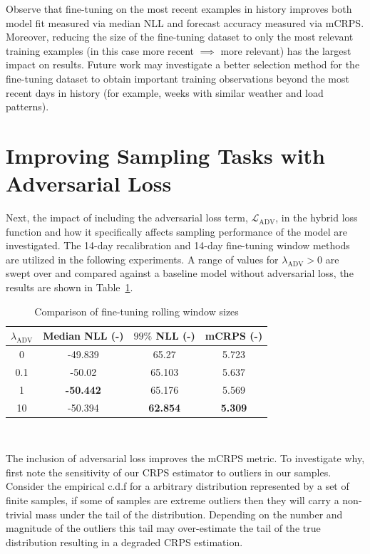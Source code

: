 Observe that fine-tuning on the most recent examples in history improves both model fit measured via
median NLL and forecast accuracy measured via mCRPS\@.
Moreover, reducing the size of the fine-tuning dataset to only the most relevant training examples (in this case more
recent $\implies$ more relevant) has the largest impact on results.
Future work may investigate a better selection method for the fine-tuning dataset to obtain important training
observations beyond the most recent days in history (for example, weeks with similar weather and load patterns).

\section{Improving Sampling Tasks with Adversarial Loss}\label{sec:improving-sampling-tasks}

Next, the impact of including the adversarial loss term, $\mathcal{L}_{\text{ADV}}$, in the hybrid loss function and
how it specifically affects sampling performance of the model are investigated.
The 14-day recalibration and 14-day fine-tuning window methods are utilized in the following experiments.
A range of values for $\lambda_{\text{ADV}} > 0$ are swept over and compared against a baseline model without adversarial
loss, the results are shown in Table~\ref{tab:ganloss}.

\begin{table}[htb]
    \caption[Results of including adversarial loss]{
        Comparison of fine-tuning rolling window sizes
    }
    \begin{center}
        \begin{tabular}{||c|c|c|c||} \hline
        $\lambda_{\text{ADV}}$ & Median NLL (-)  & $99\%$ NLL (-) & mCRPS (-)  \\	%
        \hline \hline
        0   &         -49.839  &         65.27   &         5.723 \\ \hline
        0.1 &         -50.02   &         65.103  &         5.637 \\ \hline
        1   & \textbf{-50.442} &         65.176  &         5.569 \\ \hline
        10  &         -50.394  & \textbf{62.854} & \textbf{5.309} \\ \hline
        \end{tabular}
        \\ \rule{0mm}{5mm}
    \end{center}
    \label{tab:ganloss}
\end{table}
The inclusion of adversarial loss improves the mCRPS metric.
To investigate why, first note the sensitivity of our CRPS estimator to outliers in our samples.
Consider the empirical c.d.f for a arbitrary distribution represented by a set of finite samples, if some of samples
are extreme outliers then they will carry a non-trivial mass under the tail of the distribution.
Depending on the number and magnitude of the outliers this tail may over-estimate the tail of the true distribution
resulting in a degraded CRPS estimation.

